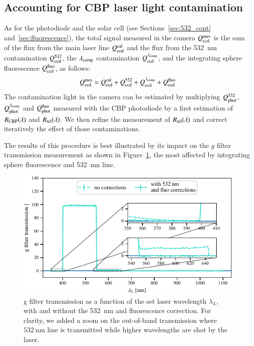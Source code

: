 \subsection{Accounting for CBP laser light contamination}\label{sec:sd_contaminations}

As for the photodiode and the solar cell (see Sections~\ref{sec:532_cont} and~\ref{sec:fluorescence}), the total signal measured in the \SD camera $Q_{\mathrm{ccd}}^{\mathrm{mes}}$ is the sum of the flux from the main laser line $Q_{\mathrm{ccd}}^{\mathrm{cal}}$ and the flux from the \SI{532}{\nm} contamination $Q_{\mathrm{ccd}}^{532}$, the $\lambda_{\rm comp}$ contamination $Q_{\mathrm{ccd}}^{\lambda_{\rm comp}}$, and the integrating sphere fluorescence $Q_{\mathrm{ccd}}^{\mathrm{fluo}}$, as follows:
\begin{equation}
    Q_{\mathrm{ccd}}^{\mathrm{mes}} = Q_{\mathrm{ccd}}^{\mathrm{cal}} + Q_{\mathrm{ccd}}^{532} + Q_{\mathrm{ccd}}^{\lambda_{\rm comp}} + Q_{\mathrm{ccd}}^{\mathrm{fluo}}
    \label{eq:qccd_mes}
\end{equation}
The contamination light in the \SD camera can be estimated by multiplying $Q_{\mathrm{phot}}^{532}$, $Q_{\mathrm{phot}}^{\lambda_{\rm comp}}$ and $Q_{\mathrm{phot}}^{\mathrm{fluo}}$ measured with the CBP photodiode by a first estimation of $R_{\mathrm{CBP}}(\lambda)$ and $R_{\mathrm{tel}}(\lambda)$. We then refine the measurement of $R_{\mathrm{tel}}(\lambda)$ and correct iteratively the effect of those contaminations.

The results of this procedure is best illustrated by its impact on the \SD $g$ filter transmission measurement as shown in Figure~\ref{fig:g_filter_532}, the most affected by integrating sphere fluorescence and \SI{532}{\nano\meter} line.

\begin{figure}[h]
    \centering
    \includegraphics[width=\columnwidth]{fig/g_filter_532.pdf}
    \caption{\SD g filter transmission as a function of the set laser wavelength $\lambda_L$, with and without the \SI{532}{\nm} and fluorescence correction. For clarity, we added a zoom on the out-of-band transmission where $\SI{532}{\nm}$ line is transmitted while higher wavelengths are shot by the laser.}
    \label{fig:g_filter_532}
\end{figure}


